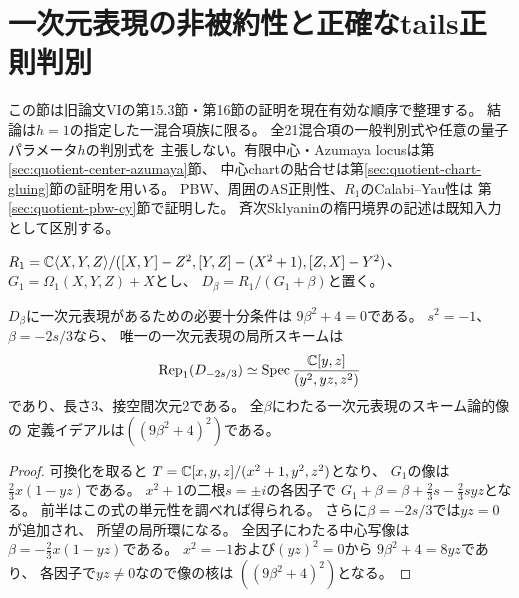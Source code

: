 \section{一次元表現の非被約性と正確なtails正則判別}
\label{sec:quotient-exact-tails}
この節は旧論文VIの第15.3節・第16節の証明を現在有効な順序で整理する。
結論は$h=1$の指定した一混合項族に限る。
全21混合項の一般判別式や任意の量子パラメータ$h$の判別式を
主張しない。有限中心・Azumaya locusは第\ref{sec:quotient-center-azumaya}節、
中心chartの貼合せは第\ref{sec:quotient-chart-gluing}節の証明を用いる。
PBW、周囲のAS正則性、$R_1$のCalabi--Yau性は
第\ref{sec:quotient-pbw-cy}節で証明した。
斉次Sklyaninの楕円境界の記述は既知入力として区別する。

$R_1=\mathbb C\langle X,Y,Z\rangle/
([X,Y]-Z^2,[Y,Z]-(X^2+1),[Z,X]-Y^2)$、
$G_1=\Omega_1(X,Y,Z)+X$とし、
$D_\beta=R_1/(G_1+\beta)$と置く。

\begin{proposition}[一次元表現を検出する中心値]
\label{prop:tails-one-dimensional}
$D_\beta$に一次元表現があるための必要十分条件は
$9\beta^2+4=0$である。
$s^2=-1$、$\beta=-2s/3$なら、
唯一の一次元表現の局所スキームは
\[
 \operatorname{Rep}_1(D_{-2s/3})
 \simeq\operatorname{Spec}\frac{\mathbb C[y,z]}{(y^2,yz,z^2)}
\]
であり、長さ3、接空間次元2である。
全$\beta$にわたる一次元表現のスキーム論的像の
定義イデアルは$((9\beta^2+4)^2)$である。
\end{proposition}
\begin{proof}
可換化を取ると
$T=\mathbb C[x,y,z]/(x^2+1,y^2,z^2)$となり、
$G_1$の像は$\frac23x(1-yz)$である。
$x^2+1$の二根$s=\pm i$の各因子で
$G_1+\beta=\beta+\frac23s-\frac23syz$となる。
前半はこの式の単元性を調べれば得られる。
さらに$\beta=-2s/3$では$yz=0$が追加され、
所望の局所環になる。
全因子にわたる中心写像は
$\beta=-\frac23x(1-yz)$である。
$x^2=-1$および$(yz)^2=0$から
$9\beta^2+4=8yz$であり、
各因子で$yz\ne0$なので像の核は
$((9\beta^2+4)^2)$となる。
\end{proof}

